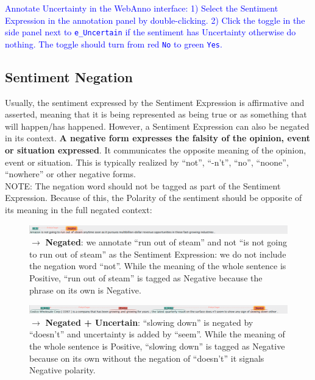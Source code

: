 \noindent
\textcolor{Blue}{Annotate Uncertainty in the WebAnno interface:
1) Select the Sentiment Expression in the annotation panel by double-clicking.
2) Click the toggle in the side panel next to \texttt{e\_Uncertain} if the sentiment has Uncertainty otherwise do nothing. The toggle should turn from red \texttt{No} to green \texttt{Yes}.}


\subsection{Sentiment Negation}
\label{sec:negationdefinition}

Usually, the sentiment expressed by the Sentiment Expression is affirmative and asserted, meaning that it is being represented as being true or as something that will happen/has happened.
However, a Sentiment Expression can also be negated in its context.
\textbf{A negative form expresses the falsity of the opinion, event or situation expressed}.
It communicates the opposite meaning of the opinion, event or situation.
This is typically realized by ``not'', ``-n't'', ``no'', ``noone'', ``nowhere'' or other negative forms.\\

\noindent
\textcolor{BrickRed}{NOTE: The negation word should not be tagged as part of the Sentiment Expression.
Because of this, the Polarity of the sentiment should be opposite of its meaning in the full negated context:}\\

\begin{figure}[h]
    \centering
    \includegraphics[width=\textwidth]{img/amzn04s34 negated negative sentiment.png}
    \caption*{$\rightarrow$ \textbf{Negated}: we annotate ``run out of steam'' and not ``is not going to run out of steam'' as the Sentiment Expression: we do not include the negation word ``not''. While the meaning of the whole sentence is Positive, ``run out of steam'' is tagged as Negative because the phrase on its own is Negative.}
    \label{fig:neg_ex1}
\end{figure}

\begin{figure}[h]
    \centering
    \includegraphics[width=\textwidth]{img/cost02s02 new sentiment negative uncertain.png}
    \caption*{$\rightarrow$ \textbf{Negated + Uncertain}: ``slowing down'' is negated by ``doesn't'' and uncertainty is added by ``seem''. While the meaning of the whole sentence is Positive, ``slowing down'' is tagged as Negative because on its own without the negation of ``doesn't'' it signals Negative polarity.}
    \label{fig:neg_ex2}
\end{figure}

